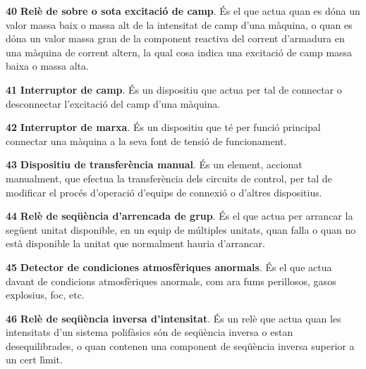 \begin{multicols}{2}
\begin{list}{}
\item[\textbf{40}]  
 \textbf{Rel\`{e} de sobre o sota excitaci\'{o} de camp}. \'{E}s el que actua quan es
d\'{o}na un valor massa baix o massa alt de la intensitat de camp d'una m\`{a}quina, o quan es d\'{o}na un valor
massa gran de la component reactiva del corrent d'armadura en una m\`{a}quina de corrent
altern, la qual cosa indica una excitaci\'{o} de camp massa baixa o massa alta.

\item[\textbf{41}]   
\textbf{Interruptor de camp}. \'{E}s un dispositiu
que actua per tal de connectar o desconnectar l'excitaci\'{o} del camp
d'una m\`{a}quina.

\item[\textbf{42}]   
\textbf{Interruptor de marxa}. \'{E}s un
dispositiu que t\'{e} per funci\'{o} principal connectar una m\`{a}quina a la
seva font de tensi\'{o} de funcionament.

\item[\textbf{43}]  
 \textbf{Dispositiu de transfer\`{e}ncia manual}. \'{E}s
un element, accionat manualment, que efectua la transfer\`{e}ncia dels circuits de control, per tal
 de modificar el proc\'{e}s d'operaci\'{o} d'equips de connexi\'{o} o d'altres dispositius.

\item[\textbf{44}]   
\textbf{Rel\`{e} de seq\"{u}\`{e}ncia
d'arrencada de grup}. \'{E}s el que actua per arrancar la seg\"{u}ent unitat
disponible, en un equip de m\'{u}ltiples unitats, quan falla o quan no
est\`{a} disponible la unitat que normalment hauria d'arrancar.

\item[\textbf{45}]   
\textbf{Detector de condiciones
atmosf\`{e}riques anormals}. \'{E}s el que actua davant de condicions atmosf\`{e}riques anormals, com ara fums
perillosos, gasos explosius, foc, etc.

\item[\textbf{46}]   
\textbf{Rel\`{e} de
seq\"{u}\`{e}ncia inversa d'intensitat}. \'{E}s un rel\`{e} que actua quan les
intensitats d'un sistema polif\`{a}sics s\'{o}n de seq\"{u}\`{e}ncia inversa o estan
desequilibrades, o quan contenen una component de seq\"{u}\`{e}ncia inversa
superior a un cert l\'{\i}mit.


\end{list}
\end{multicols}
